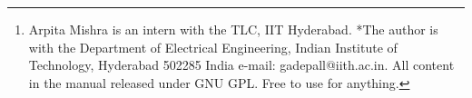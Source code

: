 \documentclass[journal,12pt,twocolumn]{IEEEtran}
\begin{document}
\author{Arpita Mishra and G V V Sharma$^{*}$ %
\thanks{Arpita Mishra is an intern with the TLC, IIT Hyderabad.  *The author is with the Department
of Electrical Engineering, Indian Institute of Technology, Hyderabad
502285 India e-mail:  gadepall@iith.ac.in. All content in the manual released under GNU GPL.  Free to use for anything.}%
}
% 
%



% 




\end{document}

